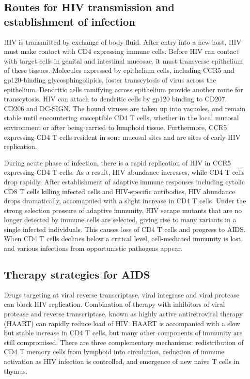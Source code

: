 \documentclass[11pt]{article}
\begin{document}
\begin{sloppypar}
\subsection{Routes for HIV transmission and establishment of infection}
HIV is transmitted by exchange of body fluid. 
After entry into a new host, HIV must make contact with CD4 expressing immune cells. 
Before HIV can contact with target cells in genital and intestinal mucosae, it must transverse epithelium of these tissues. 
Molecules expressed by epithelium cells, including CCR5 and gp120-binding glycosphingolipids, foster transcytosis of virus across the epithelium. 
Dendritic cells ramifying across epithelium provide another route for transcytosis. 
HIV can attach to dendritic cells by gp120 binding to CD207, CD206 and DC-SIGN. 
The bound viruses are taken up into vacuoles, and remain stable until encountering susceptible CD4 T cells, whether in the local mucosal environment or after being carried to lumphoid tissue. 
Furthermore, CCR5 expressing CD4 T cells resident in sone mucosal sites and are sites of early HIV replication. 

\par

During acute phase of infection, there is a rapid replication of HIV in CCR5 expressing CD4 T cells. 
As a result, HIV abundance increases, while CD4 T cells drop rapidly. 
After establishment of adaptive immune responses including cytolic CD8 T cells killing infected cells and HIV-specific antibodies, HIV abundance drops dramatically, accomapnied with a slight increase in CD4 T cells. 
Under the strong selection pressure of adaptive immunity, HIV secape mutants that are no longer detected by immune cells are selected, giving rise to many variants in a single infected individuals. 
This causes loss of CD4 T cells and progress to AIDS. 
When CD4 T cells declines below a critical level, cell-mediated immunity is lost, and various infections from opportunistic pathogens appear. 

\subsection{Therapy strategies for AIDS}
Drugs targeting at viral reverse transcriptase, viral integrase and viral protease can block HIV replication. 
Combination of therapy with inhibitors of viral protease and reverse transcriptase, known as highly active antiretroviral therapy (HAART) can rapidly reduce load of HIV. 
HAART is accompanied with a slow but stable increase in CD4 T cells, but many other components of immunity are still compromised. 
There are three complementary mechanisms: 
redistribution of CD4 T memory cells from lymphoid into circulation, 
reduction of immune activation as HIV infection is controlled, 
and emergence of new naive T cells in thymus. 


\end{sloppypar}
\end{document}
